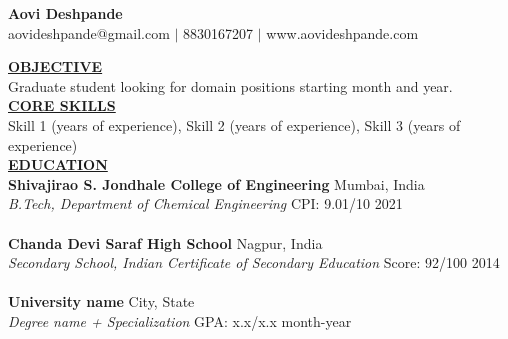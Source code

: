 \documentclass{article}
\begin{document}
\begin{center}
\thispagestyle{empty}
\large \textbf{ Aovi Deshpande \\}
\normalsize aovideshpande@gmail.com $\mid$ 8830167207 $\mid$ www.aovideshpande.com    \\
\hrulefill
\end{center}


\noindent \textbf{\underline{OBJECTIVE}} \\
\noindent Graduate student looking for domain positions starting month and year. \\


\noindent \textbf{\underline{CORE SKILLS}} \\
Skill 1 (years of experience), Skill 2 (years of experience), Skill 3 (years of experience) \\

\noindent \textbf{\underline{EDUCATION}} \\
 \textbf{Shivajirao S. Jondhale College of Engineering} \hfill Mumbai, India \\
\textit{B.Tech, Department of Chemical Engineering} \hfill CPI: 9.01/10 \hfill 2021 \\ \\
 \textbf{Chanda Devi Saraf High School} \hfill Nagpur, India \\
\textit{Secondary School, Indian Certificate of Secondary Education} \hfill Score: 92/100 \hfill 2014 \\ \\
\textbf{University name} \hfill City, State \\
\textit{Degree name + Specialization} \hfill GPA: x.x/x.x \hfill month-year \\
\end{document}
